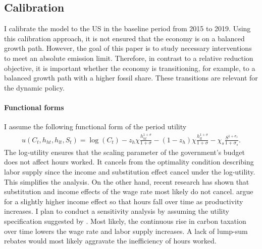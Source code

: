 \subsection{Calibration}\label{subsec:calib}


 I calibrate the model to the US in the baseline period from 2015 to 2019. Using this calibration approach, it is not ensured that the economy is on a balanced growth path. However, the goal of this paper is to study necessary interventions to meet an absolute emission limit. Therefore, in contrast to a relative reduction objective, it is important whether the economy is transitioning, for example, to a balanced growth path with a higher fossil share. These transitions are relevant for the dynamic policy. 




\paragraph{Functional forms} I assume the following functional form of the period utility
\begin{align}
u(C_t,h_{ht}, h_{lt}, S_t )= \log(C_t)-z_h\chi\frac{h_{ht}^{1+\sigma}}{{1+\sigma}}-(1-z_h)\chi\frac{h_{lt}^{1+\sigma}}{{1+\sigma}}-\chi_s\frac{S^{1+\sigma_s}}{1+\sigma_s}.
\end{align}
The log-utility ensures that the scaling parameter of the government's budget does not affect hours worked. It cancels from the optimality condition describing labor supply since the income and substitution effect cancel under the log-utility. 
This simplifies the analysis. On the other hand, recent research has shown that substitution and income effects of the wage rate most likely do not cancel. \cite{Boppart2019LaborPerspectiveb} argue for a slightly higher income effect so that hours fall over time as productivity increases. I plan to conduct a sensitivity analysis by assuming the utility specification suggested by \cite{Boppart2019LaborPerspectiveb}. Most likely, the continuous rise in carbon taxation over time lowers the wage rate and labor supply increases. A lack of lump-sum rebates would most likely aggravate the inefficiency of hours worked. %

